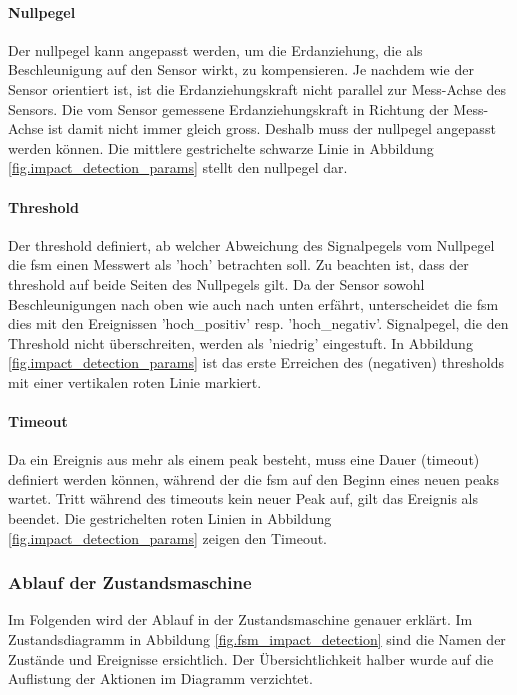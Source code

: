 \paragraph{Nullpegel} Der \gls{nullpegel} kann angepasst werden, um die Erdanziehung, die als Beschleunigung auf den Sensor wirkt, zu kompensieren. Je nachdem wie der Sensor orientiert ist, ist die Erdanziehungskraft nicht parallel zur Mess-Achse des Sensors. Die vom Sensor gemessene Erdanziehungskraft in Richtung der Mess-Achse ist damit nicht immer gleich gross. Deshalb muss der \gls{nullpegel} angepasst werden können. Die mittlere gestrichelte schwarze Linie in Abbildung \ref{fig.impact_detection_params} stellt den \gls{nullpegel} dar.

\paragraph{Threshold} Der \gls{threshold} definiert, ab welcher Abweichung des Signalpegels vom Nullpegel die \gls{fsm} einen Messwert als 'hoch' betrachten soll. Zu beachten ist, dass der \gls{threshold} auf beide Seiten des Nullpegels gilt. Da der Sensor sowohl Beschleunigungen nach oben wie auch nach unten erfährt, unterscheidet die \gls{fsm} dies mit den Ereignissen 'hoch\_positiv' resp. 'hoch\_negativ'. Signalpegel, die den Threshold nicht überschreiten, werden als 'niedrig' eingestuft. In Abbildung \ref{fig.impact_detection_params} ist das erste Erreichen des (negativen) \gls{threshold}s mit einer vertikalen roten Linie markiert.

\paragraph{Timeout} Da ein Ereignis aus mehr als einem \gls{peak} besteht, muss eine Dauer (\gls{timeout}) definiert werden können, während der die \gls{fsm} auf den Beginn eines neuen \gls{peak}s wartet. Tritt während des \gls{timeout}s kein neuer Peak auf, gilt das Ereignis als beendet. Die gestrichelten roten Linien in Abbildung \ref{fig.impact_detection_params} zeigen den Timeout.

\subsubsection{Ablauf der Zustandsmaschine}
Im Folgenden wird der Ablauf in der Zustandsmaschine genauer erklärt. Im Zustandsdiagramm in Abbildung \ref{fig.fsm_impact_detection} sind die Namen der Zustände und Ereignisse ersichtlich. Der Übersichtlichkeit halber wurde auf die Auflistung der Aktionen im Diagramm verzichtet.

